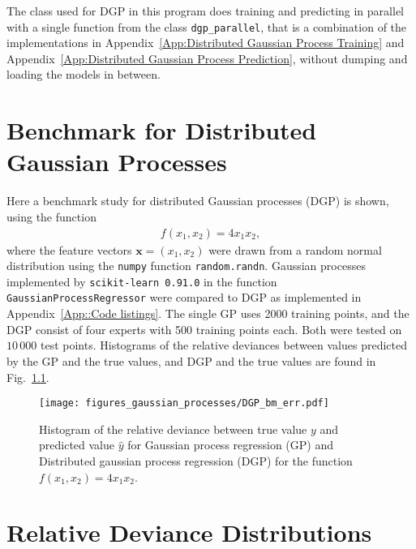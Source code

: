 \documentclass[twoside,english]{uiofysmaster}
\begin{document}
{{\begin{appendices}
The class used for DGP in this program does training and predicting in parallel with a single function from the class \verb|dgp_parallel|, that is a combination of the implementations in Appendix~\ref{App:Distributed Gaussian Process Training} and Appendix~\ref{App:Distributed Gaussian Process Prediction}, without dumping and loading the models in between.




 



\chapter{Benchmark for Distributed Gaussian Processes}\label{App:DGP Benchmark}

Here a benchmark study for distributed Gaussian processes (DGP) is shown, using the function
\begin{align*}
f(x_1, x_2) =  4x_1x_2,
\end{align*}
where the feature vectors $\textbf{x} = (x_1, x_2)$ were drawn from a random normal distribution using the \verb|numpy| function \verb|random.randn|. Gaussian processes implemented by \verb|scikit-learn 0.91.0| in the function \verb|GaussianProcessRegressor| were compared to DGP as implemented in Appendix~\ref{App::Code listings}. The single GP uses 2000 training points, and the DGP consist of four experts with 500 training points each. Both were tested on $10\,000$ test points. Histograms of the relative deviances between values predicted by the GP and the true values, and DGP and the true values are found in Fig.~\ref{Fig:: gaussian process : DGP BM error histogram}.

\begin{figure}
\centering
\texttt{[image: figures\_gaussian\_processes/DGP\_bm\_err.pdf]}
\caption[Relative deviance histogram for benchmark]{Histogram of the relative deviance between true value $y$ and predicted value $\hat{y}$ for Gaussian process regression (GP) and Distributed gaussian process regression (DGP) for the function $f(x_1,x_2) = 4x_1 x_2$.}
\label{Fig:: gaussian process : DGP BM error histogram}
\end{figure}

\chapter{Relative Deviance Distributions}\label{App:: Relative Deviance Distributions}


\end{appendices}}}
\end{document}
